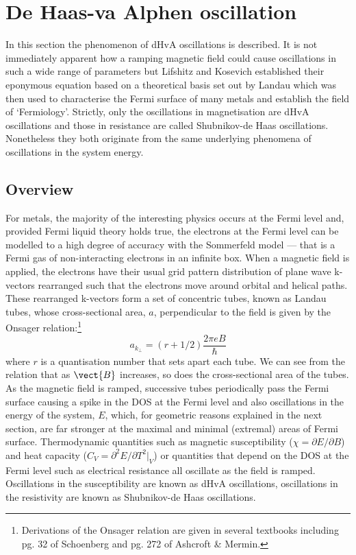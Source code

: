 
\section{De Haas-va Alphen oscillation}

In this section the phenomenon of \ac{dHvA} oscillations is described. It is not immediately apparent how a ramping magnetic field could cause oscillations in such a wide range of parameters but Lifshitz and Kosevich established their eponymous equation based on a theoretical basis set out by Landau which was then used to characterise the Fermi surface of many metals and establish the field of `Fermiology'. Strictly, only the oscillations in magnetisation are \ac{dHvA} oscillations and those in resistance are called Shubnikov-de Haas oscillations. Nonetheless they both originate from the same underlying phenomena of oscillations in the system energy.

\subsection{Overview}

For metals, the majority of the interesting physics occurs at the Fermi level and, provided Fermi liquid theory holds true, the electrons at the Fermi level can be modelled to a high degree of accuracy with the Sommerfeld model --- that is a Fermi gas of non-interacting electrons in an infinite box. When a magnetic field is applied, the electrons have their usual grid pattern distribution of plane wave k-vectors rearranged such that the electrons move around orbital and helical paths. These rearranged k-vectors form a set of concentric tubes, known as Landau tubes, whose cross-sectional area, $a$, perpendicular to the field is given by the Onsager relation:\footnote{Derivations of the Onsager relation are given in several textbooks including pg. 32 of Schoenberg\cite{Schoenberg1984} and pg. 272 of Ashcroft \& Mermin\cite{Ashcroft1976}.} 
\begin{equation}
\label{Eqn:Theo:Onsager}
\textit{a}_{k_{\perp}} = (r + 1/2)\frac{2\pi e B}{\hbar}
\end{equation}
where $r$ is a quantisation number that sets apart each tube. We can see from the relation that as $\vect{B}$ increases, so does the cross-sectional area of the tubes. As the magnetic field is ramped, successive tubes periodically pass the Fermi surface causing a spike in the \ac{DOS} at the Fermi level and also oscillations in the energy of the system, $E$, which, for geometric reasons explained in the next section, are far stronger at the maximal and minimal (extremal) areas of Fermi surface. Thermodynamic quantities such as magnetic susceptibility ($\chi = \partial E/\partial B$) and heat capacity ($C_{V} = \partial^2E/\partial T^2|_{V}$) or quantities that depend on the \ac{DOS} at the Fermi level such as electrical resistance all oscillate as the field is ramped. Oscillations in the susceptibility are known as \ac{dHvA} oscillations, oscillations in the resistivity are known as Shubnikov-de Haas oscillations.

